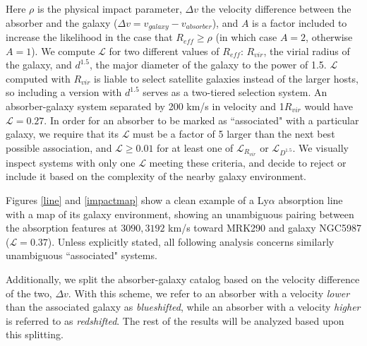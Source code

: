 \documentclass[iop]{emulateapj-rtx4}
\begin{document}
\noindent Here $\rho$ is the physical impact parameter, $\Delta v$ the velocity difference between the absorber and the galaxy ($\Delta v = v_{galaxy} - v_{absorber}$), and $A$ is a factor included to increase the likelihood in the case that $R_{eff} \geq \rho$ (in which case $A = 2$, otherwise $A = 1$). We compute $\mathcal{L}$ for two different values of $R_{eff}$: $R_{vir}$, the virial radius of the galaxy, and $d^{1.5}$, the major diameter of the galaxy to the power of 1.5. $\mathcal{L}$ computed with $R_{vir}$ is liable to select satellite galaxies instead of the larger hosts, so including a version with $d^{1.5}$ serves as a two-tiered selection system. An absorber-galaxy system separated by 200 km/s in velocity and 1$R_{vir}$ would have $\mathcal{L} = 0.27$. In order for an absorber to be marked as ``associated" with a particular galaxy, we require that its $\mathcal{L}$ must be a factor of 5 larger than the next best possible association, and $\mathcal{L} \ge 0.01$ for at least one of $\mathcal{L}_{R_{vir}}$ or $\mathcal{L}_{D^{1.5}}$. We visually inspect systems with only one $\mathcal{L}$ meeting these criteria, and decide to reject or include it based on the complexity of the nearby galaxy environment. 

Figures \ref{line} and \ref{impactmap} show a clean example of a Ly$\alpha$ absorption line with a map of its galaxy environment, showing an unambiguous pairing between the absorption features at $3090, 3192$ km/s toward MRK290 and galaxy NGC5987 ($\mathcal{L} = 0.37$). Unless explicitly stated, all following analysis concerns similarly unambiguous ``associated" systems. 

Additionally, we split the absorber-galaxy catalog based on the velocity difference of the two, $\Delta v$. With this scheme, we refer to an absorber with a velocity \textit{lower} than the associated galaxy as \textit{blueshifted}, while an absorber with a velocity \textit{higher} is referred to as \textit{redshifted}. The rest of the results will be analyzed based upon this splitting. 



\end{document}
